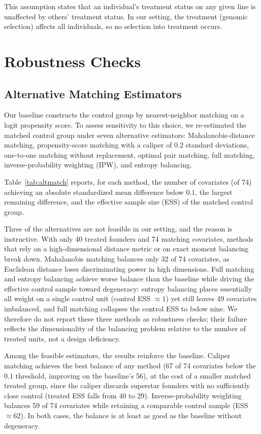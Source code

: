 \documentclass[12pt,letterpaper]{article}
\begin{document}
This assumption states that an individual's treatment status on any given line is unaffected by others' treatment status. In our setting, the treatment (genomic selection) affects all individuals, so no selection into treatment occurs.

\section{Robustness Checks\label{subsec:robustness}}
\subsection{Alternative Matching Estimators}\label{subsec:altmatch}
 
Our baseline constructs the control group by nearest-neighbor matching on a logit propensity score. To assess sensitivity to this choice, we re-estimated the matched control group under seven alternative estimators: Mahalanobis-distance matching, propensity-score matching with a caliper of $0.2$ standard deviations, one-to-one matching without replacement, optimal pair matching, full matching, inverse-probability weighting (IPW), and entropy balancing. 

Table~\ref{tab:altmatch} reports, for each method, the number of covariates (of 74) achieving an absolute standardized mean difference below $0.1$, the largest remaining difference, and the effective sample size (ESS) of the matched control group.
 
Three of the alternatives are not feasible in our setting, and the reason is instructive. With only 40 treated founders and 74 matching covariates, methods that rely on a high-dimensional distance metric or on exact moment balancing break down. Mahalanobis matching balances only 32 of 74 covariates, as Euclidean distance loses discriminating power in high dimensions. Full matching and entropy balancing achieve worse balance than the baseline while driving the effective control sample toward degeneracy: entropy balancing places essentially all weight on a single control unit (control ESS $\approx 1$) yet still leaves 49 covariates imbalanced, and full matching collapses the control ESS to below nine. We therefore do not report these three methods as robustness checks; their failure reflects the dimensionality of the balancing problem relative to the number of treated units, not a design deficiency.
 
Among the feasible estimators, the results reinforce the baseline. Caliper matching achieves the best balance of any method (67 of 74 covariates below the $0.1$ threshold, improving on the baseline's 56), at the cost of a smaller matched treated group, since the caliper discards superstar founders with no sufficiently close control (treated ESS falls from 40 to 29). Inverse-probability weighting balances 59 of 74 covariates while retaining a comparable control sample (ESS $\approx 62$). In both cases, the balance is at least as good as the baseline without degeneracy.
 
\end{document}
